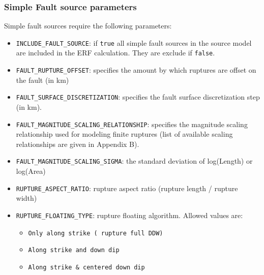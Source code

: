 \subsubsection{Simple Fault source parameters}
Simple fault sources require the following parameters:
\begin{itemize}
\item \Verb+INCLUDE_FAULT_SOURCE+: if \Verb+true+ all simple fault sources in the source model are included in the ERF calculation. They are exclude if \Verb+false+.
\item \Verb+FAULT_RUPTURE_OFFSET+: specifies the amount by which ruptures are offset on the fault (in km)
\item \Verb+FAULT_SURFACE_DISCRETIZATION+: specifies the fault surface discretization step (in km).
\item \Verb+FAULT_MAGNITUDE_SCALING_RELATIONSHIP+: specifies the magnitude scaling relationship used for modeling finite ruptures (list of available scaling relationships are given in Appendix B).
\item \Verb+FAULT_MAGNITUDE_SCALING_SIGMA+: the standard deviation of log(Length) or log(Area)
\item \Verb+RUPTURE_ASPECT_RATIO+: rupture aspect ratio (rupture length / rupture width)
\item \Verb+RUPTURE_FLOATING_TYPE+: rupture floating algorithm. Allowed values are:
\begin{itemize}
\item \Verb+Only along strike ( rupture full DDW)+
\item \Verb+Along strike and down dip+
\item \Verb+Along strike & centered down dip+
\end{itemize}
\end{itemize}

